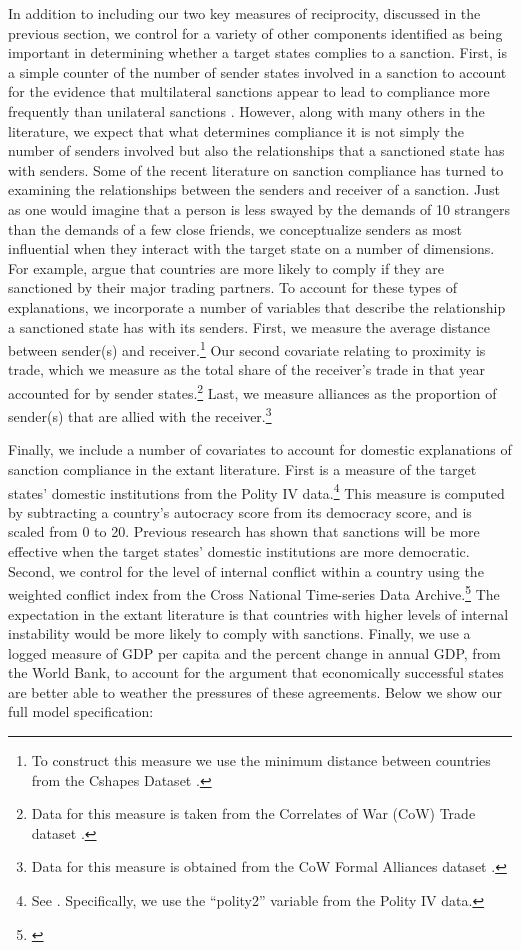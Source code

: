 In addition to including our two key measures of reciprocity, discussed in the previous section, we control for a variety of other components identified as being important in determining whether a target states complies to a sanction. First, is a simple counter of the number of sender states involved in a sanction to account for the evidence that multilateral sanctions appear to lead to compliance more frequently than unilateral sanctions \citep{bapat2009multilateral}. However, along with many others in the literature, we expect that what determines compliance it is not simply the number of senders involved but also the relationships that a sanctioned state has with senders.
Some of the recent literature on sanction compliance has turned to examining the relationships between the senders and receiver of a sanction. Just as one would imagine that a person is less swayed by the demands of 10 strangers than the demands of a few close friends, we conceptualize senders as most influential when they interact with the target state on a number of dimensions. For example, \cite{mclean2010friends} argue that countries are more likely to comply if they are sanctioned by their major trading partners. To account for these types of explanations, we incorporate a number of variables that describe the relationship a sanctioned state has with its senders. First, we measure the average distance between sender(s) and receiver.\footnote{To construct this measure we use the minimum distance between countries from the Cshapes Dataset \citep{weidmann2010geography}.} Our second covariate relating to proximity is trade, which we measure as the total share of the receiver's trade in that year accounted for by sender states.\footnote{Data for this measure is taken from the Correlates of War (CoW) Trade dataset \citep{barbieri2009trading}.} Last, we measure alliances as the proportion of sender(s) that are allied with the receiver.\footnote{Data for this measure is obtained from the CoW Formal Alliances dataset \citep{gibler2004measuring}.}

Finally, we include a number of covariates to account for domestic explanations of sanction compliance in the extant literature. First is a measure of the target states' domestic institutions from the Polity IV data.\footnote{See \cite{marshall2002polity}. Specifically, we use the ``polity2'' variable from the Polity IV data.} This measure is computed by subtracting a country's autocracy score from its democracy score, and is scaled from 0 to 20. Previous research has shown that sanctions will be more effective when the target states' domestic institutions are more democratic. Second, we control for the level of internal conflict within  a country using the weighted conflict index from the Cross National Time-series Data Archive.\footnote{\cite{banks2011cross}} The expectation in the extant literature is that countries with higher levels of internal instability would be more likely to comply with sanctions. Finally, we use a logged measure of GDP per capita and the percent change in annual GDP, from the World Bank, to account for the argument that economically successful states are better able to weather the pressures of these agreements.
Below we show our full model specification: 

